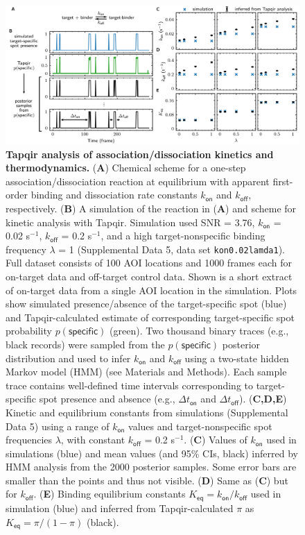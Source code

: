 \begin{figure}
\begin{fullwidth}
\includegraphics[width=183mm]{figures/kinetic_analysis.png}
\caption{\textbf{Tapqir analysis of association/dissociation kinetics and thermodynamics.} (\textbf{A}) Chemical scheme for a one-step association/dissociation reaction at equilibrium with apparent first-order binding and dissociation rate constants $k_{\mathsf{on}}$ and $k_{\mathsf{off}}$, respectively. (\textbf{B}) A simulation of the reaction in (\textbf{A}) and scheme for kinetic analysis with Tapqir. Simulation used SNR = 3.76, $k_\mathsf{on}$ = 0.02 s$^{-1}$, $k_\mathsf{off}$ = 0.2 s$^{-1}$, and a high target-nonspecific binding frequency $\lambda$ = 1 (Supplemental Data 5, data set \texttt{kon0.02lamda1}). Full dataset consists of 100 AOI locations and 1000 frames each for on-target data and off-target control data. Shown is a short extract of on-target data from a single AOI location in the simulation.  Plots show simulated presence/absence of the target-specific spot (blue) and Tapqir-calculated estimate of corresponding target-specific spot probability $p(\mathsf{specific})$ (green). Two thousand binary traces (e.g., black records) were sampled from the $p(\mathsf{specific})$ posterior distribution and used to infer $k_\mathsf{on}$ and $k_\mathsf{off}$ using a two-state hidden Markov model (HMM) (see Materials and Methods). Each sample trace contains well-defined time intervals corresponding to target-specific spot presence and absence (e.g., $\Delta t_\mathsf{on}$ and $\Delta t_\mathsf{off}$). (\textbf{C,D,E}) Kinetic and equilibrium constants from simulations (Supplemental Data 5) using a range of $k_\mathsf{on}$ values and  target-nonspecific spot frequencies $\lambda$, with constant $k_\mathsf{off}$ = 0.2 s$^{-1}$. (\textbf{C}) Values of $k_{\mathsf{on}}$ used in simulations (blue) and mean values (and 95\% CIs, black) inferred by HMM analysis from the 2000 posterior samples.  Some error bars are smaller than the points and thus not visible. (\textbf{D}) Same as (\textbf{C}) but for $k_{\mathsf{off}}$. (\textbf{E})  Binding equilibrium constants $K_{\mathsf{eq}} = k_{\mathsf{on}} / k_{\mathsf{off}}$ used in simulation (blue) and inferred from Tapqir-calculated $\pi$ as $K_{\mathsf{eq}} = \pi / (1 - \pi)$ (black). }
\label{fig:kinetic_analysis}
\end{fullwidth}
\end{figure}